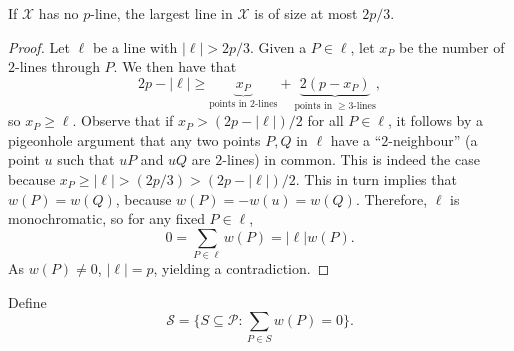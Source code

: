 \documentclass{article}
\begin{document}
	\begin{prop}
		If $\mathcal{X}$ has no $p$-line, the largest line in $\mathcal{X}$ is of size at most $2p/3$.
	\end{prop}
	\begin{proof}
		Let $\ell$ be a line with $|\ell| > 2p/3$. Given a $P \in \ell$, let $x_P$ be the number of $2$-lines through $P$. We then have that
		\[ 2p-|\ell| \ge \underbrace{x_P}_{\text{points in $2$-lines}} + \underbrace{2(p-x_P)}_{\text{points in $\ge 3$-lines}}, \]
		so $x_P \ge \ell$. Observe that if $x_P > (2p-|\ell|)/2$ for all $P \in \ell$, it follows by a pigeonhole argument that any two points $P,Q$ in $\ell$ have a ``$2$-neighbour'' (a point $u$ such that $uP$ and $uQ$ are $2$-lines) in common. This is indeed the case because $x_P \ge |\ell| > (2p/3) > (2p-|\ell|)/2$. This in turn implies that $w(P) = w(Q)$, because $w(P) = -w(u) = w(Q)$. Therefore, $\ell$ is monochromatic, so for any fixed $P \in \ell$,
		\[ 0 = \sum_{P \in \ell} w(P) = |\ell| w(P). \]
		As $w(P) \ne 0$, $|\ell| = p$, yielding a contradiction.
	\end{proof}

	Define
	\[ \mathcal{S} = \{ S \subseteq \mathcal{P} : \sum_{P \in S} w(P) = 0 \}. \]

	
	
\end{document}
